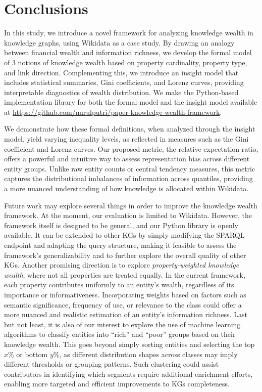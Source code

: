 \section{Conclusions}

In this study, we introduce a novel framework for analyzing knowledge wealth in knowledge graphs, using Wikidata as a case study. By drawing an analogy between financial wealth and information richness, we develop the formal model of 3 notions of knowledge wealth based on property cardinality, property type, and link direction. Complementing this, we introduce an insight model that includes statistical summaries, Gini coefficients, and Lorenz curves, providing interpretable diagnostics of wealth distribution. We make the Python-based implementation library for both the formal model and the insight model available at \url{https://github.com/nurulputri/paper-knowledge-wealth-framework}.

We demonstrate how these formal definitions, when analyzed through the insight model, yield varying inequality levels, as reflected in measures such as the Gini coefficient and Lorenz curves. Our proposed metric, the relative expectation ratio, offers a powerful and intuitive way to assess representation bias across different entity groups. Unlike raw entity counts or central tendency measures, this metric captures the distributional imbalances of information across quantiles, providing a more nuanced understanding of how knowledge is allocated within Wikidata.


Future work may explore several things in order to improve the knowledge wealth framework. At the moment, our evaluation is limited to Wikidata. However, the framework itself is designed to be general, and our Python library is openly available. It can be extended to other KGs by simply modifying the SPARQL endpoint and adapting the query structure, making it feasible to assess the framework's generalizability and to further explore the overall quality of other KGs. Another promising direction is to explore \textit{property-weighted knowledge wealth}, where not all properties are treated equally. In the current framework, each property contributes uniformly to an entity's wealth, regardless of its importance or informativeness. Incorporating weights based on factors such as semantic significance, frequency of use, or relevance to the class could offer a more nuanced and realistic estimation of an entity's information richness. Last but not least, it is also of our interest to explore the use of machine learning algorithms to classify entities into “rich” and “poor” groups based on their knowledge wealth. This goes beyond simply sorting entities and selecting the top \(x\%\) or bottom \(y\%\), as different distribution shapes across classes may imply different thresholds or grouping patterns. Such clustering could assist contributors in identifying which segments require additional enrichment efforts, enabling more targeted and efficient improvements to KGs completeness.

